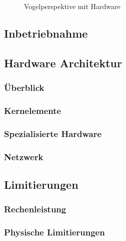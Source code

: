 \begin{figure}[h]
    \caption{Vogelperspektive mit Hardware}\label{fig:hardware}
\end{figure}

\subsection{Inbetriebnahme}

\subsection{Hardware Architektur}
\subsubsection{Überblick}
\subsubsection{Kernelemente}
\subsubsection{Spezialisierte Hardware}
\subsubsection{Netzwerk}

\subsection{Limitierungen}
\subsubsection{Rechenleistung}
\subsubsection{Physische Limitierungen}